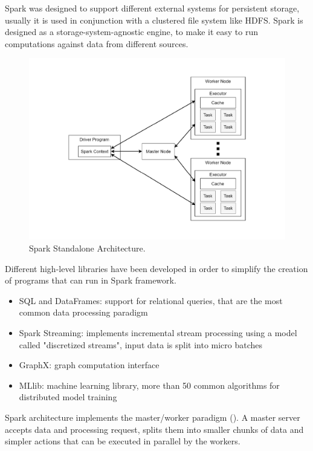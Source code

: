 Spark was designed to support different external systems for persistent storage, usually it is used in conjunction with a clustered file system like HDFS. Spark is designed as a storage-system-agnostic engine, to make it easy to run computations against data from different sources.
\begin{figure}
	\vspace{-1cm}
	\centering
	\includegraphics[width=\columnwidth]{Images/spark_standalone_architecture.pdf}  
	\vspace{-1.5cm}
	\caption[Spark Standalone Architecture]{Spark Standalone Architecture.}
	\label{fig:sparkStandaloneArchitecture}
\end{figure}

Different high-level libraries have been developed in order to simplify
the creation of programs that can run in Spark framework.
\begin{itemize}
	\item SQL and DataFrames: support for relational queries, that are the most common data processing paradigm
	\item Spark Streaming: implements incremental stream processing using a model called "discretized streams", input data is split into micro batches
	\item GraphX: graph computation interface
	\item MLlib: machine learning library, more than 50 common algorithms for distributed model training
\end{itemize}

Spark architecture implements the master/worker paradigm  (). A master server accepts data and processing request, splits them into smaller chunks of data and simpler actions that can be executed in parallel by the workers. 

